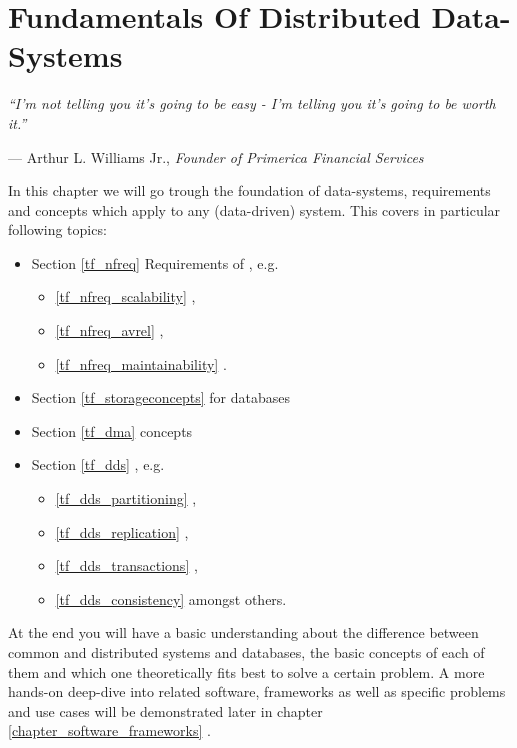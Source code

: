 \chapter{Fundamentals Of Distributed Data-Systems}
\label{chapter_technical_foundation}
\setlength{\epigraphwidth}{0.95\textwidth}
\setlength\epigraphrule{0pt}
\epigraph{\itshape ``I'm not telling you it's going to be easy - I'm telling you it's going to be worth it.''}{--- Arthur L. Williams Jr., \textit{Founder of Primerica Financial Services}}

In this chapter we will go trough the foundation of data-systems, requirements and concepts which apply to any (data-driven) system. This covers in particular following topics:
\begin{samepage}
\begin{itemize}
	\item Section \ref{tf_nfreq} Requirements of \textbf{}, e.g. 
		\begin{itemize}
			\item \ref{tf_nfreq_scalability} , 
			\item \ref{tf_nfreq_avrel} , 
			\item \ref{tf_nfreq_maintainability} .
		\end{itemize}
	\item Section \ref{tf_storageconcepts} \textbf{} for databases
	\item Section \ref{tf_dma} \textbf{} concepts
	\item Section \ref{tf_dds} \textbf{}, e.g.
		\begin{itemize}
			\item \ref{tf_dds_partitioning} , 
			\item \ref{tf_dds_replication} , 
			\item \ref{tf_dds_transactions} , 
			\item \ref{tf_dds_consistency}  amongst others.\\
		\end{itemize}
\end{itemize}
\end{samepage}

At the end you will have a basic understanding about the difference between common and distributed systems and databases, the basic concepts of each of them and which one theoretically fits best to solve a certain problem.
A more hands-on deep-dive into related software, frameworks as well as specific problems and use cases will be demonstrated later in chapter \ref{chapter_software_frameworks} .

